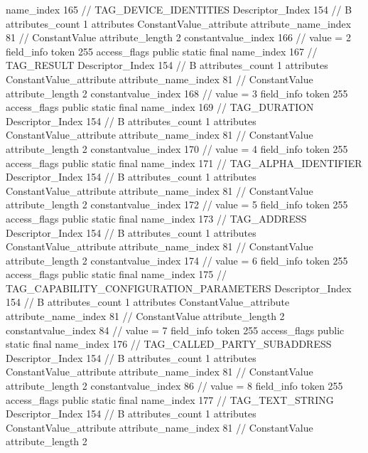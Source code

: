 {{{{{				name_index	165		// TAG_DEVICE_IDENTITIES
				Descriptor_Index	154		// B
				attributes_count	1
				attributes {
				ConstantValue_attribute {
					attribute_name_index	81		// ConstantValue
					attribute_length	2
					constantvalue_index	166		// value = 2
				}
				}
			}
			field_info {
				token	255
				access_flags	public static final
				name_index	167		// TAG_RESULT
				Descriptor_Index	154		// B
				attributes_count	1
				attributes {
				ConstantValue_attribute {
					attribute_name_index	81		// ConstantValue
					attribute_length	2
					constantvalue_index	168		// value = 3
				}
				}
			}
			field_info {
				token	255
				access_flags	public static final
				name_index	169		// TAG_DURATION
				Descriptor_Index	154		// B
				attributes_count	1
				attributes {
				ConstantValue_attribute {
					attribute_name_index	81		// ConstantValue
					attribute_length	2
					constantvalue_index	170		// value = 4
				}
				}
			}
			field_info {
				token	255
				access_flags	public static final
				name_index	171		// TAG_ALPHA_IDENTIFIER
				Descriptor_Index	154		// B
				attributes_count	1
				attributes {
				ConstantValue_attribute {
					attribute_name_index	81		// ConstantValue
					attribute_length	2
					constantvalue_index	172		// value = 5
				}
				}
			}
			field_info {
				token	255
				access_flags	public static final
				name_index	173		// TAG_ADDRESS
				Descriptor_Index	154		// B
				attributes_count	1
				attributes {
				ConstantValue_attribute {
					attribute_name_index	81		// ConstantValue
					attribute_length	2
					constantvalue_index	174		// value = 6
				}
				}
			}
			field_info {
				token	255
				access_flags	public static final
				name_index	175		// TAG_CAPABILITY_CONFIGURATION_PARAMETERS
				Descriptor_Index	154		// B
				attributes_count	1
				attributes {
				ConstantValue_attribute {
					attribute_name_index	81		// ConstantValue
					attribute_length	2
					constantvalue_index	84		// value = 7
				}
				}
			}
			field_info {
				token	255
				access_flags	public static final
				name_index	176		// TAG_CALLED_PARTY_SUBADDRESS
				Descriptor_Index	154		// B
				attributes_count	1
				attributes {
				ConstantValue_attribute {
					attribute_name_index	81		// ConstantValue
					attribute_length	2
					constantvalue_index	86		// value = 8
				}
				}
			}
			field_info {
				token	255
				access_flags	public static final
				name_index	177		// TAG_TEXT_STRING
				Descriptor_Index	154		// B
				attributes_count	1
				attributes {
				ConstantValue_attribute {
					attribute_name_index	81		// ConstantValue
					attribute_length	2
}}}}}}}
